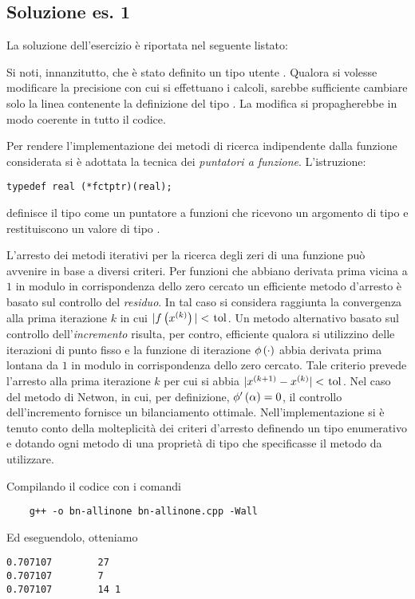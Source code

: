 \subsection*{Soluzione es. 1}

La soluzione dell'esercizio \`e riportata nel seguente listato:
%
\lstset{basicstyle=\scriptsize\sf}
    
\lstset{basicstyle=\sf}

Si noti, innanzitutto, che \`e stato definito un tipo utente
. Qualora si volesse modificare la precisione
con cui si effettuano i calcoli, sarebbe sufficiente cambiare solo la
linea contenente la definizione del tipo . La modifica si
propagherebbe in modo coerente in tutto il codice.

Per rendere l'implementazione dei metodi di ricerca indipendente dalla
funzione considerata si \`e adottata la tecnica dei \emph{puntatori a
funzione}. L'istruzione:
\begin{lstlisting}
typedef real (*fctptr)(real);
\end{lstlisting}
definisce il tipo  come un puntatore a funzioni che
ricevono un argomento di tipo  e restituiscono un valore di
tipo .

L'arresto dei metodi iterativi per la ricerca degli zeri di una
funzione pu\`o avvenire in base a diversi criteri. Per funzioni che
abbiano derivata prima vicina a $1$ in modulo in corrispondenza dello
zero cercato un efficiente metodo d'arresto \`e basato sul controllo
del \emph{residuo}. In tal caso si considera raggiunta la convergenza
alla prima iterazione $k$ in cui
$\module{\function{f}{x\iter{k}}}<\cpp{tol}$. Un metodo alternativo
basato sul controllo dell'\emph{incremento} risulta, per contro,
efficiente qualora si utilizzino delle iterazioni di punto fisso e la
funzione di iterazione $\phi\left( \cdot\right)$ abbia derivata prima
lontana da $1$ in modulo in corrispondenza dello zero cercato. Tale
criterio prevede l'arresto alla prima iterazione $k$ per cui si abbia
$\module{x\iter{k+1} - x\iter{k}}<\cpp{tol}$. Nel caso del metodo di
Netwon, in cui, per definizione, $\phi'\left( \alpha\right) = 0$, il
controllo dell'incremento fornisce un bilanciamento
ottimale. Nell'implementazione si \`e tenuto conto della
molteplicit\`a dei criteri d'arresto definendo un tipo enumerativo
 e dotando ogni metodo di una propriet\`a 
di tipo  che specificasse il metodo da utilizzare.

Compilando il codice con i comandi
\begin{verbatim}
    g++ -o bn-allinone bn-allinone.cpp -Wall
\end{verbatim}
Ed eseguendolo, otteniamo
\begin{verbatim}
0.707107        27
0.707107        7
0.707107        14 1
\end{verbatim}
